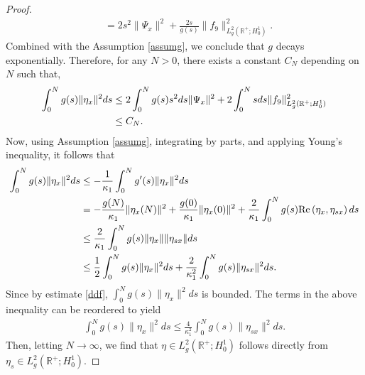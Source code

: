 \documentclass[11pt,reqno]{article}
\begin{document}
\begin{proof}
\begin{align*}
		&= 2s^2\|\Psi_x\|^2 + \frac{2s}{g(s)}\|f_9\|_{L_g^2(\mathbb{R}^+; H_0^1)} ^2.
	\end{align*}
	Combined with the Assumption \ref{assumg}, we conclude that $g$ decays exponentially. Therefore, for any $N > 0$, there exists a constant $C_N$ depending on $N$ such that,
	\begin{align}
		\int_0^N g(s)\|\eta_x\|^2ds &\leq 2\int_0^N g(s)s^2ds \|\Psi_x\|^2 + 2\int_0^N s ds \|f_9\|_{L_g^2(\mathbb{R}^+; H_0^1)}^2\notag \\
		&\leq C_N.\label{ddf}
	\end{align}
	Now, using Assumption \ref{assumg}, integrating by parts, and applying Young's inequality, it follows that
	\begin{align*}
		\int_0^N g(s)\|\eta_x\|^2ds &\leq -\frac{1}{\kappa_1}\int_0^N g'(s)\|\eta_x\|^2ds \\
		&= -\frac{g(N)}{\kappa_1}\|\eta_x(N)\|^2 + \frac{g(0)}{\kappa_1}\|\eta_x(0)\|^2 + \frac{2}{\kappa_1}\int_0^N g(s){\rm Re}\left(\eta_x, \eta_{sx}\right)ds \\
		&\leq \frac{2}{\kappa_1}\int_0^N g(s)\|\eta_x\|\|\eta_{sx}\|ds \\
		&\leq \frac{1}{2}\int_0^N g(s)\|\eta_x\|^2ds + \frac{2}{\kappa_1^2}\int_0^N g(s)\|\eta_{sx}\|^2ds.
	\end{align*}
	Since by estimate \eqref{ddf}, $\int_0^N g(s)\|\eta_x\|^2ds$ is bounded. The terms in the above inequality can be reordered to yield
	\begin{align*}
		\int_0^N g(s)\|\eta_x\|^2ds \leq \frac{4}{\kappa_1^2}\int_0^N g(s)\|\eta_{sx}\|^2ds.
	\end{align*}
	Then, letting $N \to \infty$, we find that $\eta \in L_g^2(\mathbb{R}^+; H_0^1)$ follows directly from $\eta_s \in L_g^2(\mathbb{R}^+; H_0^1)$.
	

\end{proof}
\end{document}
